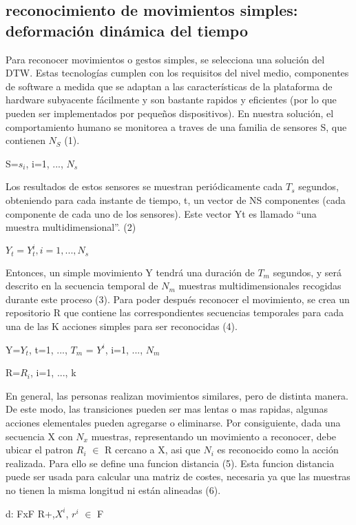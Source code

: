 \documentclass[a4paper]{article}
\begin{document}
\subsection{reconocimiento de movimientos simples: deformación dinámica del tiempo}
Para reconocer movimientos o gestos simples, se selecciona una solución del DTW. Estas tecnologías cumplen con los requisitos del nivel medio, componentes de software a medida que se adaptan a las características de la plataforma de hardware subyacente fácilmente y son bastante rapidos y eficientes (por lo que pueden ser implementados por pequeños dispositivos).
En nuestra solución, el comportamiento humano se monitorea a traves de una familia de sensores S, que contienen $N_S$ (1).
\begin{center}
S={$s_i$, i=1, ..., $N_s$}  
\end{center}
Los resultados de estos sensores se muestran periódicamente cada $T_s$ segundos, obteniendo para cada instante de tiempo, t, un vector de NS componentes (cada componente de cada uno de los sensores). Este vector Yt es llamado “una muestra multidimensional”. (2)
\begin{center}
$Y_t= {Y_t^i, i=1, ..., N_s}$            
\end{center}
Entonces, un simple movimiento Y tendrá una duración de $T_m$ segundos, y será descrito en la secuencia temporal de $N_m$ muestras multidimensionales recogidas durante este proceso (3). Para poder después reconocer el movimiento, se crea un repositorio R que contiene las correspondientes secuencias temporales para cada una de las K acciones simples para ser reconocidas (4).
\begin{center}
Y={$Y_t$, t=1, ..., $T_m$} = {$Y^i$, i=1, ..., $N_m$}
\end{center}
\begin{center}
R={$R_i$, i=1, ..., k}
\end{center}
En general, las personas realizan movimientos similares, pero de distinta manera. De este modo, las transiciones pueden ser mas lentas o mas rapidas, algunas acciones elementales pueden agregarse o eliminarse. Por consiguiente, dada una secuencia X con $N_x$ muestras, representando un movimiento a reconocer, debe ubicar el patron $R_i$ $\in$ R cercano a X, asi que $N_i$ es reconocido como la acción realizada. Para ello se define una funcion distancia (5). Esta funcion distancia puede ser usada para calcular una matriz de costes, necesaria ya que las muestras no tienen la misma longitud ni están alineadas (6). 
\begin{center}
d: FxF \longrightarrow R+,$X^i$, $r^i$ $\in$ F
\end{center}
\end{document}
